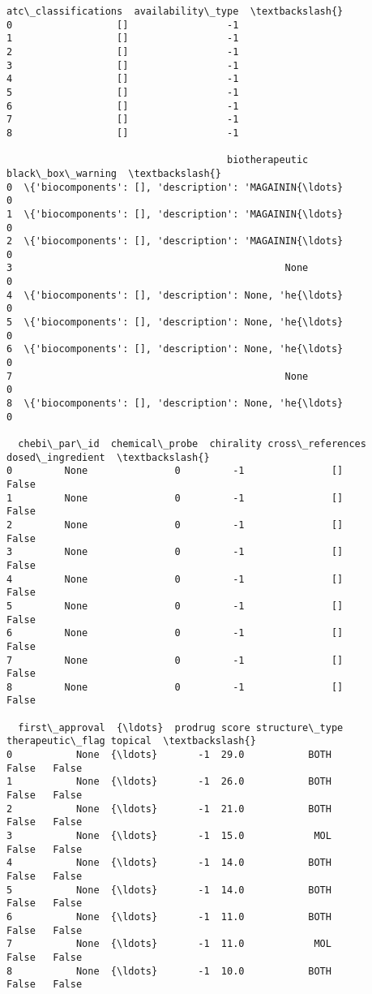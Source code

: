 \documentclass[11pt]{article}
\makeatletter
\newcommand{\boxspacing}{\kern\kvtcb@left@rule\kern\kvtcb@boxsep}
\newcommand{\prompt}[4]{
        {\ttfamily\llap{{\color{#2}[#3]:\hspace{3pt}#4}}\vspace{-\baselineskip}}
    }
\makeatother
\begin{document}
            \begin{tcolorbox}[breakable, size=fbox, boxrule=.5pt, pad at break*=1mm, opacityfill=0]
\prompt{Out}{outcolor}{144}{\boxspacing}
\begin{Verbatim}[commandchars=\\\{\}]
  atc\_classifications  availability\_type  \textbackslash{}
0                  []                 -1
1                  []                 -1
2                  []                 -1
3                  []                 -1
4                  []                 -1
5                  []                 -1
6                  []                 -1
7                  []                 -1
8                  []                 -1

                                      biotherapeutic  black\_box\_warning  \textbackslash{}
0  \{'biocomponents': [], 'description': 'MAGAININ{\ldots}                  0
1  \{'biocomponents': [], 'description': 'MAGAININ{\ldots}                  0
2  \{'biocomponents': [], 'description': 'MAGAININ{\ldots}                  0
3                                               None                  0
4  \{'biocomponents': [], 'description': None, 'he{\ldots}                  0
5  \{'biocomponents': [], 'description': None, 'he{\ldots}                  0
6  \{'biocomponents': [], 'description': None, 'he{\ldots}                  0
7                                               None                  0
8  \{'biocomponents': [], 'description': None, 'he{\ldots}                  0

  chebi\_par\_id  chemical\_probe  chirality cross\_references  dosed\_ingredient  \textbackslash{}
0         None               0         -1               []             False
1         None               0         -1               []             False
2         None               0         -1               []             False
3         None               0         -1               []             False
4         None               0         -1               []             False
5         None               0         -1               []             False
6         None               0         -1               []             False
7         None               0         -1               []             False
8         None               0         -1               []             False

  first\_approval  {\ldots}  prodrug score structure\_type  therapeutic\_flag topical  \textbackslash{}
0           None  {\ldots}       -1  29.0           BOTH             False   False
1           None  {\ldots}       -1  26.0           BOTH             False   False
2           None  {\ldots}       -1  21.0           BOTH             False   False
3           None  {\ldots}       -1  15.0            MOL             False   False
4           None  {\ldots}       -1  14.0           BOTH             False   False
5           None  {\ldots}       -1  14.0           BOTH             False   False
6           None  {\ldots}       -1  11.0           BOTH             False   False
7           None  {\ldots}       -1  11.0            MOL             False   False
8           None  {\ldots}       -1  10.0           BOTH             False   False


\end{Verbatim}
\end{tcolorbox}
\end{document}
